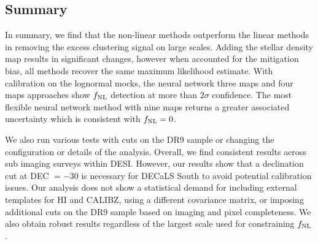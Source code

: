 \subsection{Summary}
In summary, we find that the non-linear methods outperform the linear methods in removing the excess clustering signal on large scales. Adding the stellar density map results in significant changes, however when accounted for the mitigation bias, all methods recover the same maximum likelihood estimate. With calibration on the lognormal mocks, the neural network three maps and four maps approaches show $f_{\rm NL}$ detection at more than $2\sigma$ confidence. The most flexible neural network method with nine maps returns a greater associated uncertainty which is consistent with $f_{\rm NL}=0$. 

We also run various tests with cuts on the DR9 sample or changing the configuration or details of the analysis. Overall, we find consistent results across sub imaging surveys within DESI. However, our results show that a declination cut at DEC $=-30$ is necessary for DECaLS South to avoid potential calibration issues. Our analysis does not show a statistical demand for including external templates for HI and CALIBZ, using a different covariance matrix, or imposing additional cuts on the DR9 sample based on imaging and pixel completeness. We also obtain robust results regardless of the largest scale used for constraining $f_{\rm NL}$.


